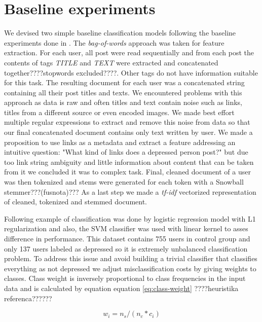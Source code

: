 \documentclass[10pt, a4paper]{article}
\begin{document}
\section{Baseline experiments}

We devised two simple baseline classification models following the baseline experiments done in \citep{losada-crestani2016}. The \textit{bag-of-words} approach was taken for feature extraction. For each user, all post were read sequentially and from each post the contents of tags \textit{TITLE} and \textit{TEXT} were extracted and concatenated together????stopwords excluded????. Other tags do not have information suitable for this task. The resulting document for each user was a concatenated string containing all their post titles and texts. We encountered problems with this approach as data is raw and often titles and text contain noise such as links, titles from a different source or even encoded images. We made best effort multiple regular expressions to extract and remove this noise from data so that our final concatenated document contains only text written by user. We made a proposition to use links as a metadata and extract a feature addressing an intuitive question: "What kind of links does a depressed person post?" but due too link string ambiguity and little information about content that can be taken from it we concluded it was to complex task. Final, cleaned document of a user was then tokenized and stems were generated for each token with a Snowball stemmer???(fusnota)??? As a last step we made a \textit{tf-idf} vectorized representation of cleaned, tokenized and stemmed document.

Following example of \citep{losada-crestani2016} classification was done by logistic regression model with L1 regularization and also, the SVM classifier was used with linear kernel to asses difference in performance. This dataset contains 755 users in control group and only 137 users labeled as depressed so it is extremely unbalanced classification problem. To address this issue and avoid building a trivial classifier that classifies everything as not depressed we adjust misclassification costs by giving weights to classes. Class weight is inversely proportional to class frequencies in the input data and is calculated by equation equation \eqref{eq:class-weight} ????heuristika referenca??????

\begin{equation}\label{eq:class-weight}
w_i = n_s / (n_c * c_i)
\end{equation}
\end{document}
